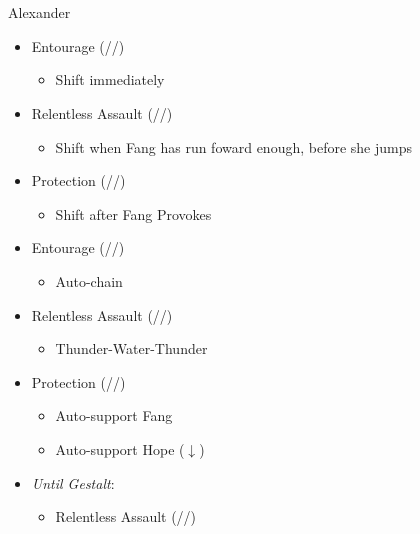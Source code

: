 \chapter[Chapter 11]{}
\begin{paracol}{2}
	\renewcommand{\first}{[1] Entourage (\rav/\med/\sen)}
	\renewcommand{\second}{[2] Protection (\syn/\med/\sen)}
	\renewcommand{\third}{[3] }
	\renewcommand{\fourth}{[4] }
	\renewcommand{\fifth}{[5] }
	\renewcommand{\sixth}{[6] Relentless Assault (\rav/\rav/\com)}
	\begin{battle}{Alexander}
		\begin{itemize}
			\item \first
			      \begin{itemize}
				      \item Shift immediately
			      \end{itemize}
			\item \sixth
			      \begin{itemize}
				      \item Shift when Fang  has run foward enough, before she jumps
			      \end{itemize}
			\item \second
			      \begin{itemize}
				      \item Shift after Fang Provokes
			      \end{itemize}
			\item \first
			      \begin{itemize}
				      \item Auto-chain
			      \end{itemize}
			\item \sixth
			      \begin{itemize}
				      \item Thunder-Water-Thunder
			      \end{itemize}
			\item \second
			      \begin{itemize}
				      \item Auto-support Fang
				      \item Auto-support Hope ($\downarrow$)
			      \end{itemize}
			\item \textit{Until Gestalt}:
			      \begin{itemize}
				      \item \begin{flushleft}\sixth\end{flushleft}

\end{itemize}
\end{itemize}
\end{battle}
\end{paracol}
